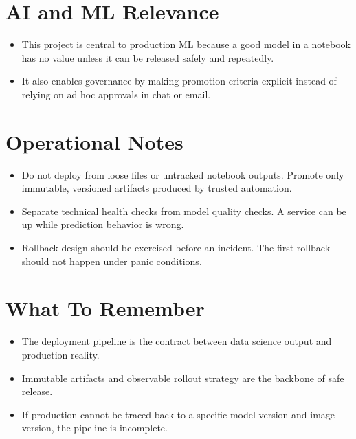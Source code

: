 \documentclass[10pt,twocolumn]{article}
\begin{document}
\section*{AI and ML Relevance}
\begin{itemize}
\item This project is central to production ML because a good model in a notebook has no value unless it can be released safely and repeatedly.
\item It also enables governance by making promotion criteria explicit instead of relying on ad hoc approvals in chat or email.
\end{itemize}

\section*{Operational Notes}
\begin{itemize}
\item Do not deploy from loose files or untracked notebook outputs. Promote only immutable, versioned artifacts produced by trusted automation.
\item Separate technical health checks from model quality checks. A service can be up while prediction behavior is wrong.
\item Rollback design should be exercised before an incident. The first rollback should not happen under panic conditions.
\end{itemize}

\section*{What To Remember}
\begin{itemize}
\item The deployment pipeline is the contract between data science output and production reality.
\item Immutable artifacts and observable rollout strategy are the backbone of safe release.
\item If production cannot be traced back to a specific model version and image version, the pipeline is incomplete.
\end{itemize}
\end{document}
